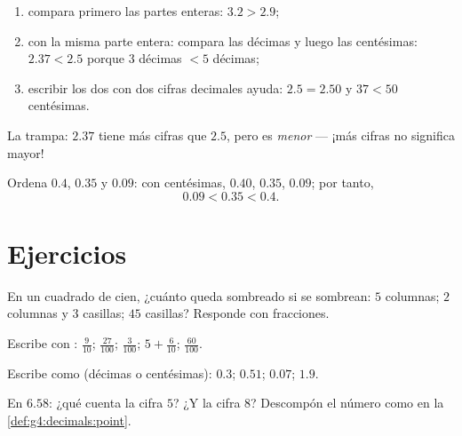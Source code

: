 \begin{method}\label{met:g4:decimals:compare}
\begin{enumerate}
  \item compara primero las partes enteras: $3.2 > 2.9$;
  \item con la misma parte entera: compara las décimas y luego las centésimas:
        $2.37 < 2.5$ porque $3$ décimas $< 5$ décimas;
  \item escribir los dos con dos cifras decimales ayuda: $2.5 = 2.50$ y
        $37 < 50$ centésimas.
\end{enumerate}
La trampa: $2.37$ tiene más cifras que $2.5$, pero es
\emph{menor} --- ¡más cifras no significa mayor!
\end{method}

\begin{example}\label{ex:g4:decimals:compare}
Ordena $0.4$, $0.35$ y $0.09$: con centésimas, $0.40$, $0.35$,
$0.09$; por tanto,
\[
0.09 < 0.35 < 0.4 .
\]
\end{example}

\section{Ejercicios}

\begin{exercise}[$\star$]\label{exo:g4:decimals:1}
En un cuadrado de cien, ¿cuánto queda sombreado si se sombrean: $5$ columnas;
$2$ columnas y $3$ casillas; $45$ casillas? Responde con fracciones.
\end{exercise}

\begin{exercise}[$\star$]\label{exo:g4:decimals:2}
Escribe con :
$\frac{9}{10}$; \quad $\frac{27}{100}$; \quad $\frac{3}{100}$; \quad
$5 + \frac{6}{10}$; \quad $\frac{60}{100}$.
\end{exercise}

\begin{exercise}[$\star$]\label{exo:g4:decimals:3}
Escribe como  (décimas o centésimas):
$0.3$; \quad $0.51$; \quad $0.07$; \quad $1.9$.
\end{exercise}

\begin{exercise}[$\star$]\label{exo:g4:decimals:4}
En $6.58$: ¿qué cuenta la cifra $5$? ¿Y la cifra $8$? Descompón
el número como en la \cref{def:g4:decimals:point}.
\end{exercise}

